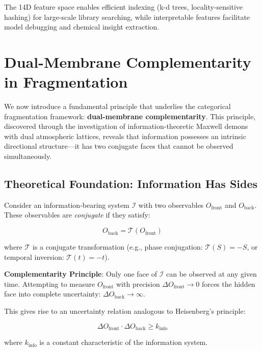 \documentclass[twocolumn,10pt,a4paper]{article}
\theoremstyle{definition}
\theoremstyle{remark}
\begin{document}
The 14D feature space enables efficient indexing (k-d trees, locality-sensitive hashing) for large-scale library searching, while interpretable features facilitate model debugging and chemical insight extraction.

\section{Dual-Membrane Complementarity in Fragmentation}
\label{sec:dual-membrane}

We now introduce a fundamental principle that underlies the categorical fragmentation framework: \textbf{dual-membrane complementarity}. This principle, discovered through the investigation of information-theoretic Maxwell demons with dual atmospheric lattices, reveals that information possesses an intrinsic directional structure—it has two conjugate faces that cannot be observed simultaneously.

\subsection{Theoretical Foundation: Information Has Sides}

Consider an information-bearing system $\mathcal{I}$ with two observables $O_{\text{front}}$ and $O_{\text{back}}$. These observables are \emph{conjugate} if they satisfy:

\begin{equation}
O_{\text{back}} = \mathcal{T}(O_{\text{front}})
\end{equation}

where $\mathcal{T}$ is a conjugate transformation (e.g., phase conjugation: $\mathcal{T}(S) = -S$, or temporal inversion: $\mathcal{T}(t) = -t$).

\textbf{Complementarity Principle}: Only one face of $\mathcal{I}$ can be observed at any given time. Attempting to measure $O_{\text{front}}$ with precision $\Delta O_{\text{front}} \to 0$ forces the hidden face into complete uncertainty: $\Delta O_{\text{back}} \to \infty$.

This gives rise to an uncertainty relation analogous to Heisenberg's principle:

\begin{equation}
\Delta O_{\text{front}} \cdot \Delta O_{\text{back}} \geq k_{\text{info}}
\label{eq:complementarity-uncertainty}
\end{equation}

where $k_{\text{info}}$ is a constant characteristic of the information system.
\end{document}
